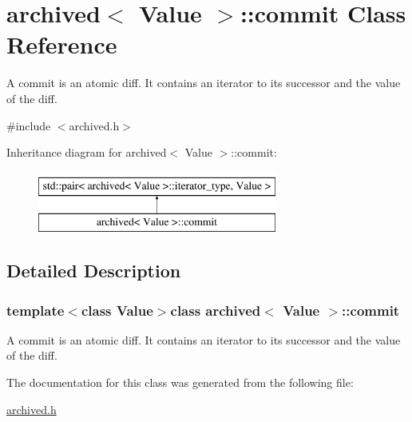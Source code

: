 \hypertarget{classarchived_1_1commit}{}\section{archived$<$ Value $>$\+:\+:commit Class Reference}
\label{classarchived_1_1commit}


A commit is an atomic diff. It contains an iterator to its successor and the value of the diff.  




{\ttfamily \#include $<$archived.\+h$>$}

Inheritance diagram for archived$<$ Value $>$\+:\+:commit\+:\begin{figure}[H]
\begin{center}
\leavevmode
\includegraphics[height=2.000000cm]{classarchived_1_1commit}
\end{center}
\end{figure}


\subsection{Detailed Description}
\subsubsection*{template$<$class Value$>$class archived$<$ Value $>$\+::commit}

A commit is an atomic diff. It contains an iterator to its successor and the value of the diff. 



The documentation for this class was generated from the following file\+:\begin{DoxyCompactItemize}
\item 
\hyperlink{archived_8h}{archived.\+h}\end{DoxyCompactItemize}
